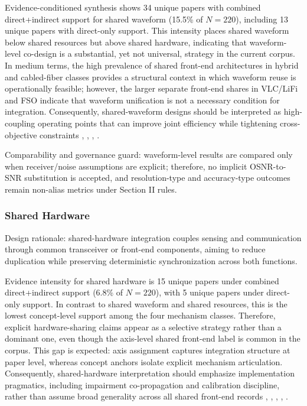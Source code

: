 Evidence-conditioned synthesis shows 34 unique papers with combined direct+indirect support for shared waveform (15.5\% of $N=220$), including 13 unique papers with direct-only support. This intensity places shared waveform below shared resources but above shared hardware, indicating that waveform-level co-design is a substantial, yet not universal, strategy in the current corpus. In medium terms, the high prevalence of shared front-end architectures in hybrid and cabled-fiber classes provides a structural context in which waveform reuse is operationally feasible; however, the larger separate front-end shares in VLC/LiFi and FSO indicate that waveform unification is not a necessary condition for integration. Consequently, shared-waveform designs should be interpreted as high-coupling operating points that can improve joint efficiency while tightening cross-objective constraints \cite{O_ISAC_035}, \cite{O_ISAC_190}, \cite{O_ISAC_304}, \cite{O_ISAC_016}.

Comparability and governance guard: waveform-level results are compared only when receiver/noise assumptions are explicit; therefore, no implicit OSNR-to-SNR substitution is accepted, and resolution-type and accuracy-type outcomes remain non-alias metrics under Section II rules.

\subsubsection{Shared Hardware}
Design rationale: shared-hardware integration couples sensing and communication through common transceiver or front-end components, aiming to reduce duplication while preserving deterministic synchronization across both functions.

Evidence intensity for shared hardware is 15 unique papers under combined direct+indirect support (6.8\% of $N=220$), with 5 unique papers under direct-only support. In contrast to shared waveform and shared resources, this is the lowest concept-level support among the four mechanism classes. Therefore, explicit hardware-sharing claims appear as a selective strategy rather than a dominant one, even though the axis-level shared front-end label is common in the corpus. This gap is expected: axis assignment captures integration structure at paper level, whereas concept anchors isolate explicit mechanism articulation. Consequently, shared-hardware interpretation should emphasize implementation pragmatics, including impairment co-propagation and calibration discipline, rather than assume broad generality across all shared front-end records \cite{O_ISAC_021}, \cite{O_ISAC_164}, \cite{O_ISAC_324}, \cite{O_ISAC_056}, \cite{O_ISAC_161}.

